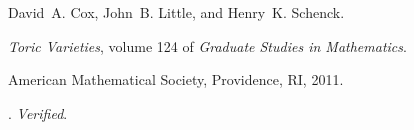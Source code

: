 David~A. Cox, John~B. Little, and Henry~K. Schenck.

\newblock \emph{Toric Varieties}, volume 124 of \emph{Graduate Studies in
  Mathematics}.

\newblock American Mathematical Society, Providence, RI, 2011.

\newblock {}.
\newblock \emph{Verified}.

